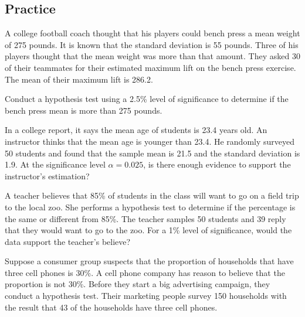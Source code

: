 \hypertarget{practice}{%
\subsection{Practice}\label{practice}}

\begin{exercise}

A college football coach thought that his players could bench press a
mean weight of 275 pounds. It is known that the standard deviation is 55
pounds. Three of his players thought that the mean weight was more than
that amount. They asked 30 of their teammates for their estimated
maximum lift on the bench press exercise. The mean of their maximum lift
is 286.2.

Conduct a hypothesis test using a 2.5\% level of significance to
determine if the bench press mean is more than 275 pounds.

\end{exercise}
\vspace*{8\baselineskip}

\begin{exercise}

In a college report, it says the mean age of students is 23.4 years old.
An instructor thinks that the mean age is younger than 23.4. He randomly
surveyed 50 students and found that the sample mean is 21.5 and the
standard deviation is 1.9. At the significance level \(\alpha=0.025\),
is there enough evidence to support the instructor's estimation?

\end{exercise}
\vspace*{8\baselineskip}

\begin{exercise}

A teacher believes that 85\% of students in the class will want to go on
a field trip to the local zoo. She performs a hypothesis test to
determine if the percentage is the same or different from 85\%. The
teacher samples 50 students and 39 reply that they would want to go to
the zoo. For a 1\% level of significance, would the data support the
teacher's believe?

\end{exercise}
\vspace*{8\baselineskip}

\begin{exercise}

Suppose a consumer group suspects that the proportion of households that
have three cell phones is 30\%. A cell phone company has reason to
believe that the proportion is not 30\%. Before they start a big
advertising campaign, they conduct a hypothesis test. Their marketing
people survey 150 households with the result that 43 of the households
have three cell phones.

\end{exercise}
\vspace*{8\baselineskip}

